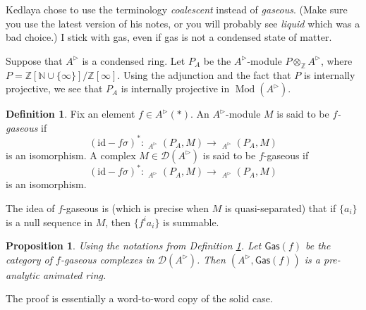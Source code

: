 \documentclass{article}
\theoremstyle{plain}
\newtheorem{prop}[thm]{Proposition}
\theoremstyle{definition}
\newtheorem{defi}[thm]{Definition}
\theoremstyle{remark}
\DeclareMathOperator{\Homs}{\underline{Hom}}
\DeclareMathOperator{\rhoms}{\underline{RHom}}
\DeclareMathOperator{\modcat}{Mod}
\newcommand{\huflag}{\triangleright}
\newcommand{\D}{\mathcal{D}}
\begin{document}
Kedlaya chose to use the terminology \emph{coalescent} instead of \emph{gaseous}.
(Make sure you use the latest version of his notes, or you will probably see \emph{liquid} which was a bad choice.)
I stick with gas, even if gas is not a condensed state of matter.

Suppose that $ A ^{\huflag} $ is a condensed ring.
Let $ P _{A} $ be the $ A ^{\huflag} $-module $ P \otimes _{\mathbb{Z}} A ^{\huflag} $,
where $ P = \mathbb{Z}[\mathbb{N}\cup \{\infty\}] / \mathbb{Z}[\infty] $.
Using the adjunction and the fact that $ P $ is internally projective,
we see that $ P _{A} $ is internally projective in $ \modcat (A ^{\huflag}) $.

\begin{defi}
Fix an element $ f\in A ^{\huflag} (*) $. An $ A ^{\huflag} $-module $ M $ is said to be \emph{$ f $-gaseous} if
\begin{equation*}
(\mathrm{id} - f \sigma)^{*}: \Homs _{A ^{\huflag}}(P _{A}, M) \to \Homs _{A ^{\huflag}}(P _{A}, M)
\end{equation*}
is an isomorphism.
A complex $ M\in \D (A ^{\huflag}) $ is said to be $ f $-gaseous if
\begin{equation}
(\mathrm{id}-f \sigma)^{*}: \rhoms _{A ^{\huflag}}(P _{A}, M)\to \rhoms _{A ^{\huflag}}(P _{A}, M)
\end{equation}
is an isomorphism.
\label{gaseous::def}
\end{defi}

The idea of $ f $-gaseous is (which is precise when $ M $ is quasi-separated) that
if $ \{a _{i}\} $ is a null sequence in $ M $, then
$ \{f ^{i} a _{i}\} $ is summable.

\begin{prop}
Using the notations from Definition \ref{gaseous::def}.
Let $ \mathsf{Gas}(f) $ be the category of $ f $-gaseous complexes in $ \D (A ^{\huflag}) $.
Then $ (A ^{\huflag}, \mathsf{Gas}(f)) $ is a pre-analytic animated ring.
\end{prop}

The proof is essentially a word-to-word copy of the solid case.
\end{document}
